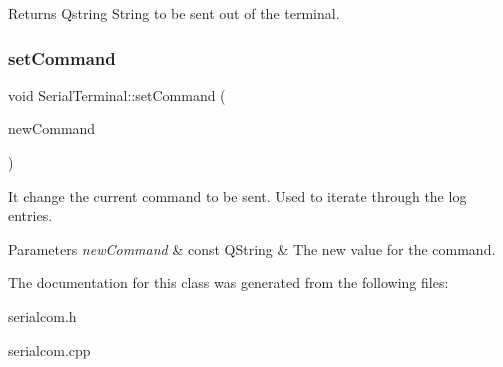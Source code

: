 \begin{DoxyReturn}{Returns}
Qstring String to be sent out of the terminal. 
\end{DoxyReturn}
\mbox{\label{classSerialTerminal_a0bec3c5cd061b502ce104e7add993510}} 
\subsubsection{\texorpdfstring{set\+Command}{setCommand}}
{\footnotesize\ttfamily void Serial\+Terminal\+::set\+Command (\begin{DoxyParamCaption}\item[{const Q\+String \&}]{new\+Command }\end{DoxyParamCaption})\hspace{0.3cm}{\ttfamily [slot]}}



It change the current command to be sent. Used to iterate through the log entries. 


\begin{DoxyParams}{Parameters}
{\em new\+Command} & const Q\+String \& The new value for the command. \\
\hline
\end{DoxyParams}


The documentation for this class was generated from the following files\+:\begin{DoxyCompactItemize}
\item 
serialcom.\+h\item 
serialcom.\+cpp\end{DoxyCompactItemize}
